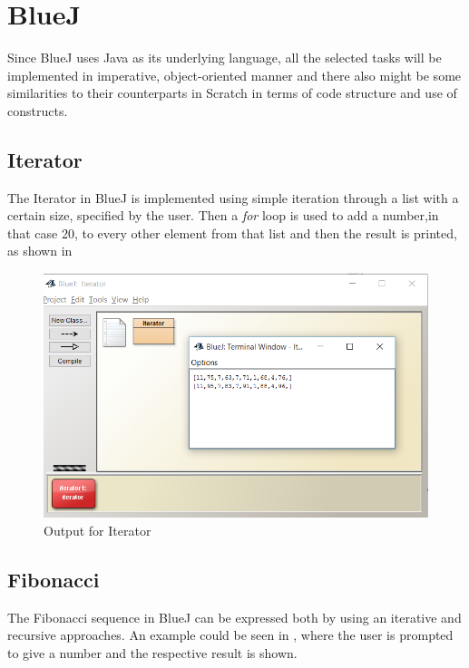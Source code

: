 \section{BlueJ}
\label{sec:bluej}



Since BlueJ uses Java as its underlying language, all the selected tasks will be implemented in imperative, object-oriented manner and there also might be some similarities to their counterparts in Scratch in terms of code structure and use of constructs.
\subsection{Iterator}
The Iterator in BlueJ is implemented using simple iteration through a list with a certain size, specified by the user. Then a \textit{for} loop is used to add a number,in that case 20, to every other element from that list and then the result is printed, as shown in 

\begin{figure}[!h]
  \centering
      \includegraphics[scale=0.7]{./pics/bluej_iterator_code}
      \caption{Output for Iterator}
      \label{fig:bluej_iterator_code} 
\end{figure}

\subsection{Fibonacci}
The Fibonacci sequence in BlueJ can be expressed both by using an iterative and recursive approaches. An example could be seen in , where the user is prompted to give a number and the respective result is shown.

